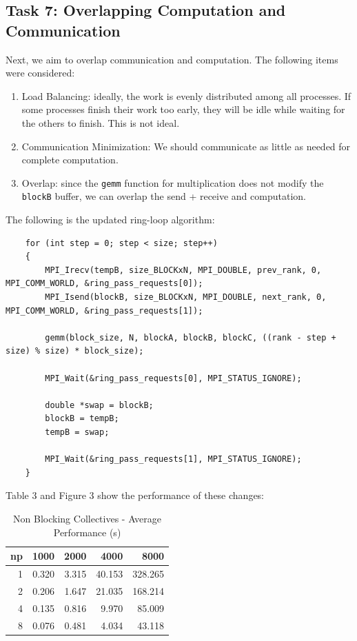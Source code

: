 \documentclass{article}
\begin{document}
\subsection*{Task 7: Overlapping Computation and Communication}
Next, we aim to overlap communication and computation. The following items were considered:
\begin{enumerate}
    \item Load Balancing: ideally, the work is evenly distributed among all 
    processes. If some processes finish their work too early, they will be idle while 
    waiting for the others to finish. This is not ideal.
    \item Communication Minimization: We should communicate as little as needed for complete computation.
    \item Overlap: since the \texttt{gemm} function for multiplication does not modify the \texttt{blockB} buffer, 
    we can overlap the send + receive and computation.
\end{enumerate}
The following is the updated ring-loop algorithm:
\begin{lstlisting}
    for (int step = 0; step < size; step++)
    {
        MPI_Irecv(tempB, size_BLOCKxN, MPI_DOUBLE, prev_rank, 0, MPI_COMM_WORLD, &ring_pass_requests[0]);
        MPI_Isend(blockB, size_BLOCKxN, MPI_DOUBLE, next_rank, 0, MPI_COMM_WORLD, &ring_pass_requests[1]);

        gemm(block_size, N, blockA, blockB, blockC, ((rank - step + size) % size) * block_size);

        MPI_Wait(&ring_pass_requests[0], MPI_STATUS_IGNORE);

        double *swap = blockB;
        blockB = tempB;
        tempB = swap;

        MPI_Wait(&ring_pass_requests[1], MPI_STATUS_IGNORE);
    }
\end{lstlisting}
Table 3 and Figure 3 show the performance of these changes:
\begin{table}[H]
    \centering
    \caption{Non Blocking Collectives - Average Performance (s)}
    \fontsize{12}{14}\selectfont
    \begin{tabular}[t]{rrrrr}
    \toprule
    np & 1000 & 2000 & 4000 & 8000\\
    \midrule
    1 & 0.320 & 3.315 & 40.153 & 328.265\\
    2 & 0.206 & 1.647 & 21.035 & 168.214\\
    4 & 0.135 & 0.816 & 9.970 & 85.009\\
    8 & 0.076 & 0.481 & 4.034 & 43.118\\
    \bottomrule
    \end{tabular}
\end{table}
\end{document}
